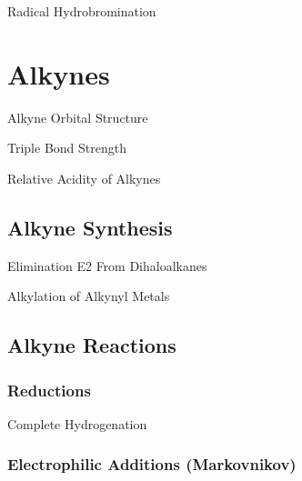 \documentclass[10pt]{article}
\begin{document}
      \begin{core}{Radical Hydrobromination}

      \end{core}

\section{Alkynes}

  \begin{core}{Alkyne Orbital Structure}

  \end{core}

  \begin{core}{Triple Bond Strength}

  \end{core}

  \begin{core}{Relative Acidity of Alkynes}

  \end{core}

  \subsection{Alkyne Synthesis}

    \begin{core}{Elimination E2 From Dihaloalkanes}

    \end{core}

    \begin{core}{Alkylation of Alkynyl Metals}

    \end{core}

  \subsection{Alkyne Reactions}

    \subsubsection{Reductions}

      \begin{core}{Complete Hydrogenation}

      \end{core}

    \subsubsection{Electrophilic Additions (Markovnikov)}
\end{document}
